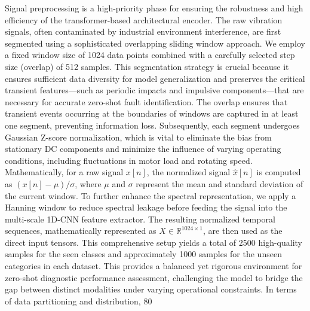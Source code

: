 Signal preprocessing is a high-priority phase for ensuring the robustness and high efficiency of the transformer-based architectural encoder. The raw vibration signals, often contaminated by industrial environment interference, are first segmented using a sophisticated overlapping sliding window approach. We employ a fixed window size of 1024 data points combined with a carefully selected step size (overlap) of 512 samples. This segmentation strategy is crucial because it ensures sufficient data diversity for model generalization and preserves the critical transient features—such as periodic impacts and impulsive components—that are necessary for accurate zero-shot fault identification. The overlap ensures that transient events occurring at the boundaries of windows are captured in at least one segment, preventing information loss. Subsequently, each segment undergoes Gaussian Z-score normalization, which is vital to eliminate the bias from stationary DC components and minimize the influence of varying operating conditions, including fluctuations in motor load and rotating speed. Mathematically, for a raw signal $x[n]$, the normalized signal $\hat{x}[n]$ is computed as $(x[n] - \mu) / \sigma$, where $\mu$ and $\sigma$ represent the mean and standard deviation of the current window. To further enhance the spectral representation, we apply a Hanning window to reduce spectral leakage before feeding the signal into the multi-scale 1D-CNN feature extractor. The resulting normalized temporal sequences, mathematically represented as $X \in \mathbb{R}^{1024 \times 1}$, are then used as the direct input tensors. This comprehensive setup yields a total of 2500 high-quality samples for the seen classes and approximately 1000 samples for the unseen categories in each dataset. This provides a balanced yet rigorous environment for zero-shot diagnostic performance assessment, challenging the model to bridge the gap between distinct modalities under varying operational constraints. In terms of data partitioning and distribution, 80%

